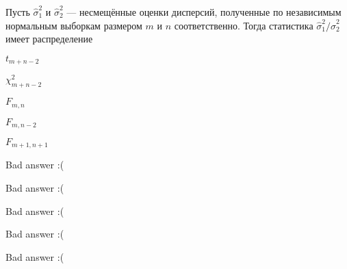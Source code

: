 
\begin{question}
Пусть \(\hat\sigma^2_1\) и \(\hat\sigma^2_2\) --- несмещённые оценки
дисперсий, полученные по независимым нормальным выборкам размером \(m\)
и \(n\) соответственно. Тогда статистика
\(\hat\sigma^2_1/\hat\sigma^2_2\) имеет распределение
\begin{answerlist}
  \item \(t_{m+n-2}\)
  \item \(\chi^2_{m+n-2}\)
  \item \(F_{m,n}\)
  \item \(F_{m,n-2}\)
  \item \(F_{m+1, n+1}\)
\end{answerlist}
\end{question}

\begin{solution}
\begin{answerlist}
  \item Bad answer :(
  \item Bad answer :(
  \item Bad answer :(
  \item Bad answer :(
  \item Bad answer :(
\end{answerlist}
\end{solution}

